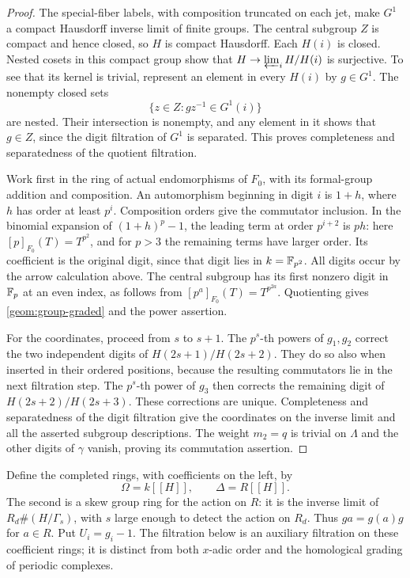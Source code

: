 \begin{proof}
The special-fiber labels, with composition truncated on each jet,
make $G^1$ a compact Hausdorff inverse limit of finite groups.  The central subgroup $Z$ is compact and hence
closed, so $H$ is compact Hausdorff.  Each $H(i)$ is closed.  Nested
cosets in this compact group show that $H\to\varprojlim_i H/H(i)$
is surjective.  To see that its kernel is trivial, represent an
element in every $H(i)$ by $g\in G^1$.  The nonempty closed sets
\[
 \{z\in Z:g z^{-1}\in G^1(i)\}
\]
are nested.  Their intersection is nonempty, and any element in it
shows that $g\in Z$, since the digit filtration of $G^1$ is separated.
This proves completeness and separatedness of the quotient filtration.

Work first in the ring of actual endomorphisms of $F_0$, with its
formal-group addition and composition.  An automorphism beginning
in digit $i$ is $1+h$, where $h$ has order at least $p^i$.
Composition orders give the commutator inclusion.  In the binomial
expansion of $(1+h)^p-1$, the leading term at order $p^{i+2}$ is
$ph$: here $[p]_{F_0}(T)=T^{p^2}$, and for $p>3$ the remaining
terms have larger order.  Its coefficient is the original digit,
since that digit lies in $k=\mathbb F_{p^2}$.  All digits occur by the
arrow calculation above.  The central subgroup has its first
nonzero digit in $\mathbb F_p$ at an even index, as follows from
$[p^a]_{F_0}(T)=T^{p^{2a}}$.  Quotienting gives
\eqref{geom:group-graded} and the power assertion.

For the coordinates, proceed from $s$ to $s+1$.  The $p^s$-th
powers of $g_1,g_2$ correct the two independent digits of
$H(2s+1)/H(2s+2)$.  They do so also when inserted in their ordered
positions, because the resulting commutators lie in the next
filtration step.  The $p^s$-th power of $g_3$ then corrects the
remaining digit of $H(2s+2)/H(2s+3)$.  These corrections are unique.
Completeness and separatedness of the digit filtration give the
coordinates on the inverse limit and all the asserted subgroup
descriptions.  The weight $m_2=q$ is trivial on $\Lambda$ and the
other digits of $\gamma$ vanish, proving its commutation assertion.
\end{proof}

Define the completed rings, with coefficients on the left, by
\[
 \Omega=k[[H]],\qquad \Delta=R[[H]].
\]
The second is a skew group ring for the action on $R$: it is the
inverse limit of $R_d\#(H/\Gamma_s)$, with $s$ large enough to
detect the action on $R_d$.  Thus $g a=g(a)g$ for $a\in R$.
Put $U_i=g_i-1$.  The filtration below is an auxiliary filtration on
these coefficient rings; it is distinct from both $x$-adic order and
the homological grading of periodic complexes.

